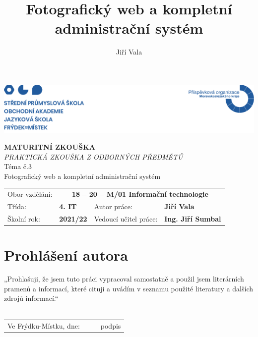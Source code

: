 \documentclass[12pt,a4paper]{report}
\title{Fotografický web a kompletní administrační systém}
\author{Jiří Vala}
\date{}
\begin{document}
\renewcommand*\listfigurename{}
\renewcommand{\figurename}{Obr.}
\renewcommand\refname{}



\begin{titlepage}
  \begin{adjustwidth}{-20mm}{-7.5mm} 
		\vspace*{-1.5cm}
		\noindent\includegraphics[width=\linewidth]{header.png}
	\end{adjustwidth}
	\begin{center}
		\vspace*{0.2cm}
    \color{pojblue}
		\Huge\textbf{MATURITNÍ ZKOUŠKA}
    \color{black}
    \vspace*{1cm} \\
		\large \emph{PRAKTICKÁ ZKOUŠKA Z ODBORNÝCH PŘEDMĚTŮ}
		\vspace*{1cm} \\
		\Large Téma č.3 \\
		\vspace*{1cm}
		\Large Fotografický web a kompletní administrační systém \\
		\vfill
		\normalsize
	\end{center}
	\begin{tabularx}{\textwidth}{l@{\hskip 0.5cm}XXl}
		Obor vzdělání: & \multicolumn{3}{c}{\textbf{18 – 20 – M/01 Informační technologie}} \\[10pt]
		Třída: & \textbf{4. IT} & Autor práce: & \textbf{Jiří Vala} \\[10pt]
		Školní rok: & \textbf{2021/22} & Vedoucí učitel práce: & \textbf{Ing. Jiří Sumbal}
		\vspace*{1cm}
	\end{tabularx}
\end{titlepage}

\section*{Prohlášení autora}
  „Prohlašuji, že jsem tuto práci vypracoval samostatně a použil jsem literárních pramenů a informací, které cituji a uvádím v seznamu použité literatury a dalších zdrojů informací.“ \\
	\vspace*{0.5cm} \\
	\renewcommand{\arraystretch}{2}
	\begin{tabularx}{\textwidth}{l@{\hskip 0.75cm}X@{\hskip 1.5cm}X@{\hskip 0.75cm}l}
		Ve Frýdku-Místku, dne: & \dotfill & \dotfill & podpis \\
	\end{tabularx}
  \clearpage
\end{document}
